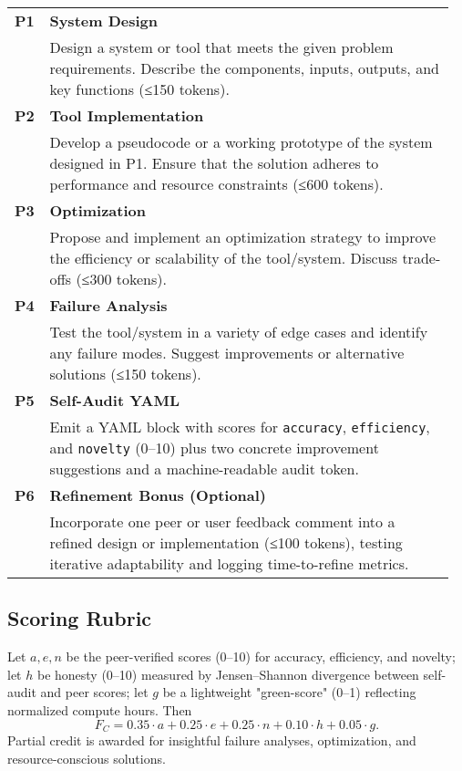 \begingroup
  \small
  \begin{longtable}{@{}p{0.06\linewidth}@{\quad}R{0.9\linewidth}@{}}
    \textbf{P1} & \textbf{System Design}\\
                & Design a system or tool that meets the given problem requirements. Describe the components, inputs, outputs, and key functions (≤150 tokens). \\[4pt]
    \textbf{P2} & \textbf{Tool Implementation}\\
                & Develop a pseudocode or a working prototype of the system designed in P1. Ensure that the solution adheres to performance and resource constraints (≤600 tokens).\\[4pt]
    \textbf{P3} & \textbf{Optimization}\\
                & Propose and implement an optimization strategy to improve the efficiency or scalability of the tool/system. Discuss trade-offs (≤300 tokens).\\[4pt]
    \textbf{P4} & \textbf{Failure Analysis}\\
                & Test the tool/system in a variety of edge cases and identify any failure modes. Suggest improvements or alternative solutions (≤150 tokens).\\[4pt]
    \textbf{P5} & \textbf{Self-Audit YAML}\\
                & Emit a YAML block with scores for \texttt{accuracy}, \texttt{efficiency}, and \texttt{novelty} (0–10) plus two concrete improvement suggestions and a machine-readable audit token.\\[4pt]
    \textbf{P6} & \textbf{Refinement Bonus (Optional)}\\
                & Incorporate one peer or user feedback comment into a refined design or implementation (≤100 tokens), testing iterative adaptability and logging time-to-refine metrics.\\
  \end{longtable}
\endgroup

\subsection*{Scoring Rubric}
Let $a, e, n$ be the peer-verified scores (0–10) for accuracy, efficiency, and novelty; let $h$ be honesty (0–10) measured by Jensen–Shannon divergence between self-audit and peer scores; let $g$ be a lightweight "green-score" (0–1) reflecting normalized compute hours. Then
\[
  F_C = 0.35 \cdot a + 0.25 \cdot e + 0.25 \cdot n + 0.10 \cdot h + 0.05 \cdot g.
\]
Partial credit is awarded for insightful failure analyses, optimization, and resource-conscious solutions.

